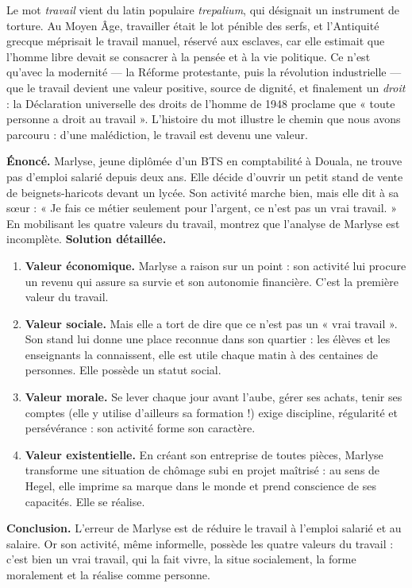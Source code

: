 \documentclass[11pt]{article}
\begin{document}
\begin{savaistu}
Le mot \emph{travail} vient du latin populaire \emph{trepalium}, qui désignait un instrument de torture. Au Moyen Âge, travailler était le lot pénible des serfs, et l'Antiquité grecque méprisait le travail manuel, réservé aux esclaves, car elle estimait que l'homme libre devait se consacrer à la pensée et à la vie politique. Ce n'est qu'avec la modernité — la Réforme protestante, puis la révolution industrielle — que le travail devient une valeur positive, source de dignité, et finalement un \emph{droit} : la Déclaration universelle des droits de l'homme de 1948 proclame que « toute personne a droit au travail ». L'histoire du mot illustre le chemin que nous avons parcouru : d'une malédiction, le travail est devenu une valeur.
\end{savaistu}

\begin{exoresolu}
\textbf{Énoncé.} Marlyse, jeune diplômée d'un BTS en comptabilité à Douala, ne trouve pas d'emploi salarié depuis deux ans. Elle décide d'ouvrir un petit stand de vente de beignets-haricots devant un lycée. Son activité marche bien, mais elle dit à sa sœur : « Je fais ce métier seulement pour l'argent, ce n'est pas un vrai travail. » En mobilisant les quatre valeurs du travail, montrez que l'analyse de Marlyse est incomplète.
\tcblower
\textbf{Solution détaillée.}
\begin{enumerate}
\item \textbf{Valeur économique.} Marlyse a raison sur un point : son activité lui procure un revenu qui assure sa survie et son autonomie financière. C'est la première valeur du travail.
\item \textbf{Valeur sociale.} Mais elle a tort de dire que ce n'est pas un « vrai travail ». Son stand lui donne une place reconnue dans son quartier : les élèves et les enseignants la connaissent, elle est utile chaque matin à des centaines de personnes. Elle possède un statut social.
\item \textbf{Valeur morale.} Se lever chaque jour avant l'aube, gérer ses achats, tenir ses comptes (elle y utilise d'ailleurs sa formation !) exige discipline, régularité et persévérance : son activité forme son caractère.
\item \textbf{Valeur existentielle.} En créant son entreprise de toutes pièces, Marlyse transforme une situation de chômage subi en projet maîtrisé : au sens de Hegel, elle imprime sa marque dans le monde et prend conscience de ses capacités. Elle se réalise.
\end{enumerate}
\textbf{Conclusion.} L'erreur de Marlyse est de réduire le travail à l'emploi salarié et au salaire. Or son activité, même informelle, possède les quatre valeurs du travail : c'est bien un vrai travail, qui la fait vivre, la situe socialement, la forme moralement et la réalise comme personne.
\end{exoresolu}
\end{document}
